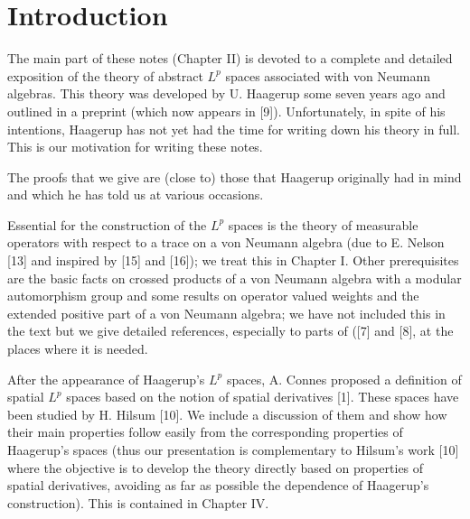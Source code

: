 
% 
\chapter*{Introduction}
The main part of these notes (Chapter II) is devoted to a complete and detailed exposition of the theory of abstract $L^p$ spaces associated with von Neumann algebras. This theory was developed by U. Haagerup some seven years ago and outlined in a preprint (which now appears in [9]). Unfortunately, in spite of his intentions, Haagerup has not yet had the time for writing down his theory in full. This is our motivation for writing these notes.\par
The proofs that we give are (close to) those that Haagerup originally had in mind and which he has told us at various occasions.\par
Essential for the construction of the $L^p$ spaces is the theory of measurable operators with respect to a trace on a von Neumann algebra (due to E. Nelson [13] and inspired by [15] and [16]); we treat this in Chapter I. Other prerequisites are the basic facts on crossed products of a von Neumann algebra with a modular automorphism group and some results on operator valued weights and the extended positive part of a von Neumann algebra; we have not included this in the text but we give detailed references, especially to parts of ([7] and [8], at the places where it is needed.\par
After the appearance of Haagerup's $L^p$ spaces, A. Connes proposed a definition of spatial $L^p$ spaces based on the notion of spatial derivatives [1]. These spaces have been studied by H. Hilsum [10]. We include a discussion of them and show how their main properties follow easily from the corresponding properties of Haagerup's spaces (thus our presentation is complementary to Hilsum's work [10] where the objective is to develop the theory directly based on properties of spatial derivatives, avoiding as far as possible the dependence of Haagerup's construction). This is contained in Chapter IV.\par
